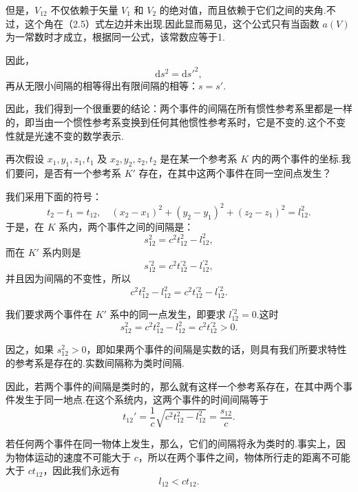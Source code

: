 但是，$V_{12}$ 不仅依赖于矢量 $V_1$ 和 $V_2$ 的绝对值，而且依赖于它们之间的夹角.不过，这个角在（2.5）式左边并未出现.因此显而易见，这个公式只有当函数 $a(V)$ 为一常数时才成立，根据同一公式，该常数应等于1.

因此，
\begin{equation}
  \mathrm{d}s^2=\mathrm{d}s'^2,
\end{equation}
再从无限小间隔的相等得出有限间隔的相等：$s=s'$.

因此，我们得到一个很重要的结论：两个事件的间隔在所有惯性参考系里都是一样的，即当由一个惯性参考系变换到任何其他惯性参考系时，它是不变的.这个不变性就是光速不变的数学表示.

再次假设 $x_1,y_1,z_1,t_1$ 及 $x_2,y_2,z_2,t_2$ 是在某一个参考系 $K$ 内的两个事件的坐标.我们要问，是否有一个参考系 $K'$ 存在，在其中这两个事件在同一空间点发生？

我们采用下面的符号：
\begin{equation*}
  t_2-t_1=t_{12},\quad
  (x_2-x_1)^2+(y_2-y_1)^2+(z_2-z_1)^2=l_{12}^2.
\end{equation*}
于是，在 $K$ 系内，两个事件之间的间隔是：
\begin{equation*}
  s_{12}^2=c^2t_{12}^2-l_{12}^2,
\end{equation*}
而在 $K'$ 系内则是
\begin{equation*}
  s_{12}^{\prime 2}=c^2t_{12}^{\prime 2}-l_{12}^{\prime 2},
\end{equation*}
并且因为间隔的不变性，所以
\begin{equation*}
  c^2t_{12}^2-l_{12}^2=c^2t_{12}^{\prime 2}-l_{12}^{\prime 2}.
\end{equation*}

我们要求两个事件在 $K'$ 系中的同一点发生，即要求 $l_{12}^{\prime 2}=0$.这时
\begin{equation*}
  s_{12}^2=c^2t_{12}^2-l_{12}^2=c^2t_{12}^{\prime 2}>0.
\end{equation*}

因之，如果 $s_{12}^2>0$，即如果两个事件的间隔是实数的话，则具有我们所要求特性的参考系是存在的.实数间隔称为类时间隔.

因此，若两个事件的间隔是类时的，那么就有这样一个参考系存在，在其中两个事件发生于同一地点.在这个系统内，这两个事件的时间间隔等于
\begin{equation}
  t_{12}'=\frac{1}{c}\sqrt{c^2t_{12}^2-l_{12}^2}=\frac{s_{12}}{c}.
\end{equation}

若任何两个事件在同一物体上发生，那么，它们的间隔将永为类时的.事实上，因为物体运动的速度不可能大于 $c$，所以在两个事件之间，物体所行走的距离不可能大于 $ct_{12}$，因此我们永远有
\begin{equation*}
  l_{12}<ct_{12}.
\end{equation*}


